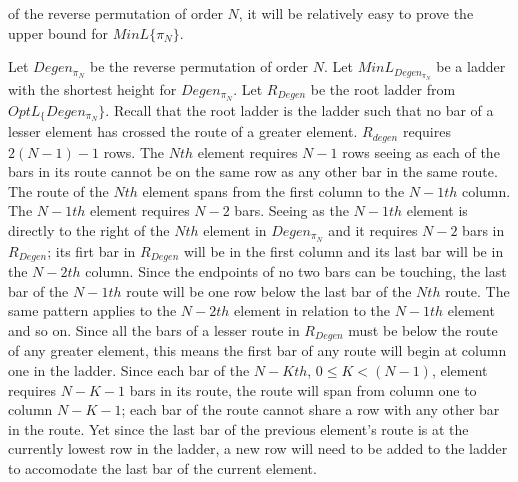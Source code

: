 of the reverse permutation of order $N$, it will be relatively easy to prove the upper bound 
for $MinL\{\pi_{N}\}$.\par 
 Let $Degen_{\pi_{N}}$ be the reverse permutation of order 
 $N$. Let $MinL_{Degen_{\pi_{N}}}$ be a ladder with the shortest height for $Degen_{\pi_{N}}$.
 Let $R_{Degen}$ be the root ladder from $OptL_\{Degen_{\pi_{N}}\}$. Recall that the root ladder is the ladder such 
    that no bar of a lesser element has crossed the route of a greater element. $R_{degen}$ requires 
    $2(N-1)-1$ rows. The $Nth$ element requires $N-1$ rows seeing as each of the bars in its route cannot be on the same row as 
    any other bar in the same route. The route of the $Nth$ element spans from the first column to the $N-1th$ column.
    The $N-1th$ element requires $N-2$ bars. Seeing as the $N-1th$  element is directly to the right of the $Nth$ element 
    in $Degen_{\pi_{N}}$ and it requires $N-2$ bars in $R_{Degen}$; its firt bar in $R_{Degen}$ will be in the first column and its last bar will be in the
    $N-2th$ column. Since the endpoints of no two bars can be touching, the last bar of the $N-1th$ route 
    will be one row below the last bar of the $Nth$ route. The same pattern applies to the $N-2th$ element in relation 
    to the $N-1th$ element and so on. Since all the bars of a lesser route in $R_{Degen}$ must be below the route of 
    any greater element, this means the first bar of any route will begin at column one in the ladder. Since each bar 
    of the $N-Kth$, $0 \leq K < (N-1)$, element requires $N-K-1$ bars in its route, the route will span from column one to 
    column $N-K-1$; each bar of the route cannot share a row with any other bar in the route.
   Yet since the last bar of the previous element's route is at the currently lowest row in the ladder, a new row 
   will need to be added to the ladder to accomodate the last bar of the current element.\par 
   
